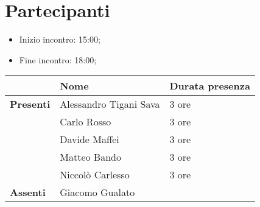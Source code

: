 \section{Partecipanti}

\begin{itemize}
    \item Inizio incontro: 15:00;
    \item Fine incontro: 18:00;
\end{itemize}


\begin{center}
{\renewcommand{\arraystretch}{1.5}
\begin{tabular}{lll}
	                    & \textbf{Nome}  			& \textbf{Durata presenza} \\
	\hline
	\textbf{Presenti}	& Alessandro Tigani Sava 	& 3 ore 					\\ 
						& Carlo Rosso 				& 3 ore 					\\
						& Davide Maffei 			& 3 ore 					\\
						& Matteo Bando 				& 3 ore 					\\
						& Niccolò Carlesso          & 3 ore						\\
	\hline
	\textbf{Assenti}	& Giacomo Gualato           &      						\\
\end{tabular}	
}
\end{center}